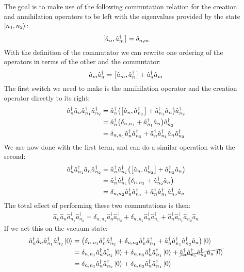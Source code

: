 \documentclass[12pt]{article}
\newcommand{\kd}[2]{\delta_{#1,#2}}
\begin{document}
The goal is to make use of the following commutation relation for the creation and annihilation operators to be left with the eigenvalues provided by the state $\ket{n_1,n_2}$:
\begin{align*}
  \comm{\hat{a}_n}{\hat{a}^\dag_m}=\delta_{n,m}
\end{align*}
With the definition of the commutator we can rewrite one ordering of the operators in terms of the other and the commutator:
\begin{align*}
  \hat{a}_m\hat{a}_n^\dag=
  \comm{\hat{a}_m}{\hat{a}^\dag_n}+\hat{a}^\dag_n\hat{a}_m
\end{align*}
The first switch we need to make is the annihilation operator and the creation operator directly to its right:
\begin{align*}
  \hat{a}_n^\dag\hat{a}_n\hat{a}^\dag_{n_1}\hat{a}^\dag_{n_2}&=
  \hat{a}_n^\dag \qty(\comm{\hat{a}_n}{\hat{a}^\dag_{n_1}}
  +\hat{a}^\dag_{n_1}\hat{a}_n)\hat{a}^\dag_{n_2}\\
  &=\hat{a}_n^\dag \qty(\kd{n}{n_1}
  +\hat{a}^\dag_{n_1}\hat{a}_n)\hat{a}^\dag_{n_2}\\
  &=\kd{n}{n_1}\hat{a}_n^\dag\hat{a}^\dag_{n_2}
  +\hat{a}_n^\dag\hat{a}^\dag_{n_1}\hat{a}_n\hat{a}^\dag_{n_2}
\end{align*}
We are now done with the first term, and can do a similar operation with the second:
\begin{align*}
  \hat{a}_n^\dag\hat{a}^\dag_{n_1}\hat{a}_n\hat{a}^\dag_{n_2}&=
  \hat{a}_n^\dag\hat{a}^\dag_{n_1}\qty(\comm{\hat{a}_n}{\hat{a}^\dag_{n_2}}
  +\hat{a}^\dag_{n_2}\hat{a}_n)\\
  &=\hat{a}_n^\dag\hat{a}^\dag_{n_1}\qty(\kd{n}{n_2}
  +\hat{a}^\dag_{n_2}\hat{a}_n)\\
  &=\kd{n}{n_2}\hat{a}_n^\dag\hat{a}^\dag_{n_1}+
  \hat{a}_n^\dag\hat{a}^\dag_{n_1}\hat{a}^\dag_{n_2}\hat{a}_n
\end{align*}
The total effect of performing these two commutations is then:
\begin{align*}
  \hat{a}_n^\dag\hat{a}_n\hat{a}^\dag_{n_1}\hat{a}^\dag_{n_2}=
  \kd{n}{n_1}\hat{a}_n^\dag\hat{a}^\dag_{n_2}
  +\kd{n}{n_2}\hat{a}_n^\dag\hat{a}^\dag_{n_1}
  +\hat{a}_n^\dag\hat{a}^\dag_{n_1}\hat{a}^\dag_{n_2}\hat{a}_n
\end{align*}
If we act this on the vacuum state:
\begin{align*}
  \hat{a}_n^\dag\hat{a}_n\hat{a}^\dag_{n_1}\hat{a}^\dag_{n_2}\ket{0}&=
  \qty(\kd{n}{n_1}\hat{a}_n^\dag\hat{a}^\dag_{n_2}
  +\kd{n}{n_2}\hat{a}_n^\dag\hat{a}^\dag_{n_1}
  +\hat{a}_n^\dag\hat{a}^\dag_{n_1}\hat{a}^\dag_{n_2}\hat{a}_n)\ket{0}\\
  &=\kd{n}{n_1}\hat{a}_n^\dag\hat{a}^\dag_{n_2}\ket{0}
  +\kd{n}{n_2}\hat{a}_n^\dag\hat{a}^\dag_{n_1}\ket{0}
  +\cancel{\hat{a}_n^\dag\hat{a}^\dag_{n_1}\hat{a}^\dag_{n_2}\hat{a}_n\ket{0}}\\
  &=\kd{n}{n_1}\hat{a}_n^\dag\hat{a}^\dag_{n_2}\ket{0}
  +\kd{n}{n_2}\hat{a}_n^\dag\hat{a}^\dag_{n_1}\ket{0}
\end{align*}
\end{document}
